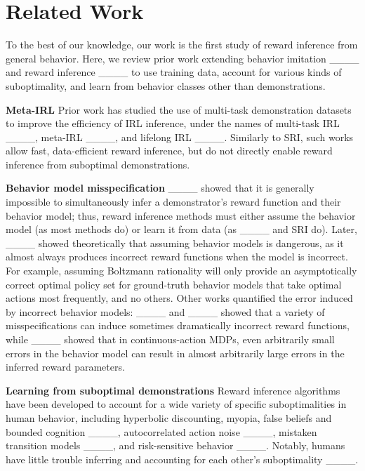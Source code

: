 \section{Related Work}
\label{sec:relatedwork}

To the best of our knowledge, our work is the first study of reward inference from general behavior. 
Here, we review prior work extending behavior imitation ____ and reward inference ____ to use training data, account for various kinds of suboptimality, and learn from behavior classes other than demonstrations.







\textbf{Meta-IRL} Prior work has studied the use of multi-task demonstration datasets to improve the efficiency of IRL inference, under the names of multi-task IRL ____, meta-IRL ____, and lifelong IRL ____. Similarly to SRI, such works allow fast, data-efficient reward inference, but do not directly enable reward inference from suboptimal demonstrations.






\textbf{Behavior model misspecification} ____ showed that it is generally impossible to simultaneously infer a demonstrator's reward function and their behavior model; thus, reward inference methods must either assume the behavior model (as most methods do) or learn it from data (as ____ and SRI do). Later, ____ showed theoretically that assuming behavior models is dangerous, as it almost always produces incorrect reward functions when the model is incorrect. For example, assuming Boltzmann rationality will only provide an asymptotically correct optimal policy set for ground-truth behavior models that take optimal actions most frequently, and no others.
Other works quantified the error induced by incorrect behavior models: ____ and ____ showed that a variety of misspecifications can induce sometimes dramatically incorrect reward functions, while ____ showed that in continuous-action MDPs, even arbitrarily small errors in the behavior model can result in almost arbitrarily large errors in the inferred reward parameters.



\textbf{Learning from suboptimal demonstrations} Reward inference algorithms have been developed to account for a wide variety of specific suboptimalities in human behavior, including hyperbolic discounting, myopia, false beliefs and bounded cognition ____, autocorrelated action noise ____, mistaken transition models ____, and risk-sensitive behavior ____. Notably, humans have little trouble inferring and accounting for each other's suboptimality ____.

